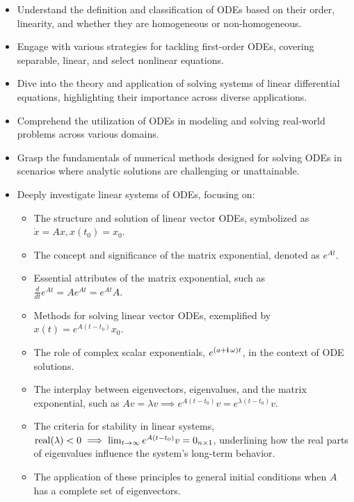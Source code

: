 \begin{itemize}
\item Understand the definition and classification of ODEs based on their order, linearity, and whether they are homogeneous or non-homogeneous.
\item Engage with various strategies for tackling first-order ODEs, covering separable, linear, and select nonlinear equations.
\item Dive into the theory and application of solving systems of linear differential equations, highlighting their importance across diverse applications.
\item Comprehend the utilization of ODEs in modeling and solving real-world problems across various domains.
\item Grasp the fundamentals of numerical methods designed for solving ODEs in scenarios where analytic solutions are challenging or unattainable.
\item Deeply investigate linear systems of ODEs, focusing on:
    \begin{itemize}
    \item The structure and solution of linear vector ODEs, symbolized as $\dot{x} = Ax, x(t_0) = x_0$.
    \item The concept and significance of the matrix exponential, denoted as $e^{At}$.
    \item Essential attributes of the matrix exponential, such as $\frac{d}{dt} e^{At} = A e^{At} =  e^{At} A$.
    \item Methods for solving linear vector ODEs, exemplified by $x(t) = e^{A(t-t_0)} x_0$.
    \item The role of complex scalar exponentials,  $e^{\left( a + \mathop{\bm{\mathrm i}} \omega \right) t}$,  in the context of ODE solutions.
    \item The interplay between eigenvectors, eigenvalues, and the matrix exponential, such as  $Av = \lambda v \implies  e^{A(t-t_0)} v = e^{\lambda(t-t_0)} v$.
    \item The criteria for stability in linear systems, ${\rm real} (\lambda) < 0 \implies \lim_{t\to \infty} e^{A(t-t_0)} v = 0_{n \times 1}$, underlining how the real parts of eigenvalues influence the system's long-term behavior.
    \item The application of these principles to general initial conditions when $A$ has a complete set of eigenvectors.        
    \end{itemize}    
\end{itemize}




